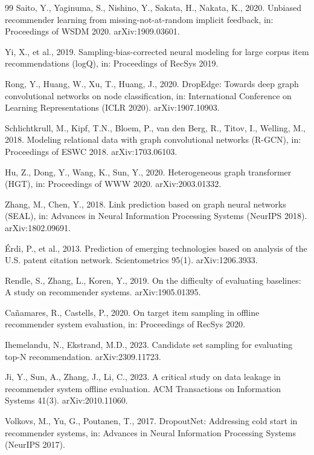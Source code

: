 \documentclass[preprint,12pt]{elsarticle}
\begin{document}
\begin{thebibliography}{99}
Saito, Y., Yaginuma, S., Nishino, Y., Sakata, H., Nakata, K., 2020. Unbiased recommender learning from missing-not-at-random implicit feedback, in: Proceedings of WSDM 2020. arXiv:1909.03601.

Yi, X., et al., 2019. Sampling-bias-corrected neural modeling for large corpus item recommendations (logQ), in: Proceedings of RecSys 2019.

Rong, Y., Huang, W., Xu, T., Huang, J., 2020. DropEdge: Towards deep graph convolutional networks on node classification, in: International Conference on Learning Representations (ICLR 2020). arXiv:1907.10903.

Schlichtkrull, M., Kipf, T.N., Bloem, P., van den Berg, R., Titov, I., Welling, M., 2018. Modeling relational data with graph convolutional networks (R-GCN), in: Proceedings of ESWC 2018. arXiv:1703.06103.

Hu, Z., Dong, Y., Wang, K., Sun, Y., 2020. Heterogeneous graph transformer (HGT), in: Proceedings of WWW 2020. arXiv:2003.01332.

Zhang, M., Chen, Y., 2018. Link prediction based on graph neural networks (SEAL), in: Advances in Neural Information Processing Systems (NeurIPS 2018). arXiv:1802.09691.

\'{E}rdi, P., et al., 2013. Prediction of emerging technologies based on analysis of the U.S. patent citation network. Scientometrics 95(1). arXiv:1206.3933.

Rendle, S., Zhang, L., Koren, Y., 2019. On the difficulty of evaluating baselines: A study on recommender systems. arXiv:1905.01395.

Ca\~{n}amares, R., Castells, P., 2020. On target item sampling in offline recommender system evaluation, in: Proceedings of RecSys 2020.

Ihemelandu, N., Ekstrand, M.D., 2023. Candidate set sampling for evaluating top-N recommendation. arXiv:2309.11723.

Ji, Y., Sun, A., Zhang, J., Li, C., 2023. A critical study on data leakage in recommender system offline evaluation. ACM Transactions on Information Systems 41(3). arXiv:2010.11060.

Volkovs, M., Yu, G., Poutanen, T., 2017. DropoutNet: Addressing cold start in recommender systems, in: Advances in Neural Information Processing Systems (NeurIPS 2017).

\end{thebibliography}
\end{document}
